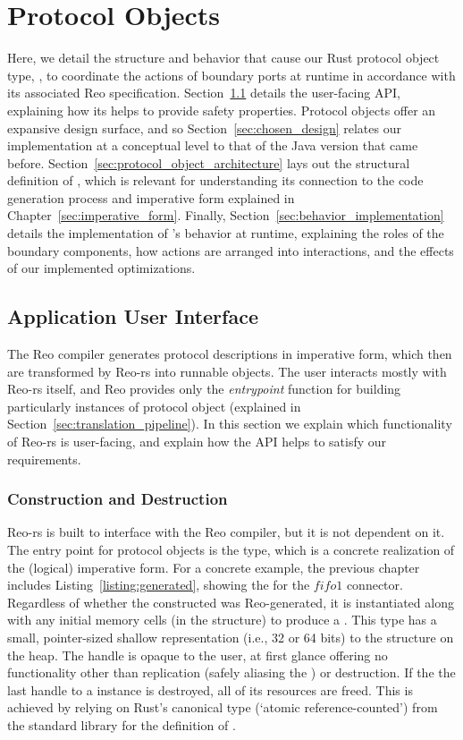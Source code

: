 \section{Protocol Objects}
\label{sec:protocol_objects}
Here, we detail the structure and behavior that cause our Rust protocol object type, , to coordinate the actions of boundary ports at runtime in accordance with its associated Reo specification. Section~\ref{sec:user_facing} details the user-facing API, explaining how its helps to provide safety properties. Protocol objects offer an expansive design surface, and so Section~\ref{sec:chosen_design} relates our implementation at a conceptual level to that of the Java version that came before. Section~\ref{sec:protocol_object_architecture} lays out the structural definition of , which is relevant for understanding its connection to the code generation process and imperative form explained in Chapter~\ref{sec:imperative_form}. Finally, Section~\ref{sec:behavior_implementation} details the implementation of 's behavior at runtime, explaining the roles of the boundary components, how actions are arranged into interactions, and the effects of our implemented optimizations.

\subsection{Application User Interface}
\label{sec:user_facing}
The Reo compiler generates protocol descriptions in imperative form, which then are transformed by Reo-rs into runnable objects. The user interacts mostly with Reo-rs itself, and Reo provides only the \textit{entrypoint} function for building particularly instances of protocol object (explained in	 Section~\ref{sec:translation_pipeline}). In this section we explain which functionality of Reo-rs is user-facing, and explain how the API helps to satisfy our requirements.


\subsubsection{Construction and Destruction}
\label{sec:construction_and_destruction}
Reo-rs is built to interface with the Reo compiler, but it is not dependent on it. The entry point for protocol objects is the  type, which is a concrete realization of the (logical) imperative form. For a concrete example, the previous chapter includes Listing~\ref{listing:generated}, showing the  for the $fifo1$ connector. Regardless of whether the constructed  was Reo-generated, it is instantiated along with any initial memory cells (in the  structure) to produce a . This type has a small, pointer-sized shallow representation (i.e., 32 or 64 bits) to the  structure on the heap. The handle is opaque to the user, at first glance offering no functionality other than replication (safely aliasing the ) or destruction. If the the last handle to a  instance is destroyed, all of its resources are freed. This is achieved by relying on Rust's canonical  type (`atomic reference-counted') from the standard library for the definition of .

